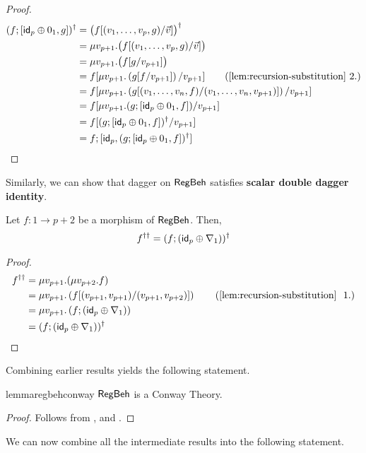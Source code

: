 \begin{proof}
\begin{align*}
(f ; \lc  \id_p \oplus 0_1 , g \rc)^\dagger & = \big(f[(v_1,\dots,v_p, g)/\vec{v}]\big)^\dagger	
\\
& = \mu v_{p+1}.\big(f[(v_1,\dots,v_p, g)/\vec{v}]\big)
\\
& = \mu v_{p+1}.\big(f[g/v_{p+1}]\big)
\\
& = f[\mu v_{p+1}. \left(g[f/v_{p+1}]\right)/v_{p+1}] \tag{\Cref{lem:recursion-substitution}~2.}
\\
& = f[\mu v_{p+1}. \left(g[(v_1,\dots,v_n,f)/(v_1,\dots,v_n,v_{p+1})]\right)/v_{p+1}]\\
& = f[\mu v_{p+1}. (g ;  \lc  \id_p \oplus 0_1 , f\rc)/v_{p+1}]
\\
& = f[(g ;  \lc  \id_p \oplus 0_1 , f\rc)^\dagger/v_{p+1}]
\\
& = f ; \lc \id_p, (g ;  \lc  \id_p \oplus 0_1 , f\rc)^\dagger\rc \qedhere
\end{align*}
\end{proof}
Similarly, we can show that dagger on $\mathsf{RegBeh}$ satisfies \textbf{scalar double dagger identity}. 
\begin{lemma}\label{conway3}
Let $f \colon 1 \to p + 2$ be a morphism of $\mathsf{RegBeh}$. Then,
		$$
		f^{\dagger\dagger} = (f ; (\mathsf{id}_p\oplus \nabla_1))^\dagger
		$$
\end{lemma}
\begin{proof}
\begin{align*}
f^{\dagger\dagger} &= \mu v_{p+1}.(\mu v_{p+2}.f)
\\
& = \mu v_{p+1}. \left(f [(v_{p+1}, v_{p+1}) / (v_{p+1}, v_{p+2})]\right) \tag{\Cref{lem:recursion-substitution}~ 1.}
\\
& = \mu v_{p+1}. \left(f;(\id_p\oplus \nabla_1)\right)
\\
& = (f ; (\id_p\oplus \nabla_1))^\dagger \tag*{\hfill\qedhere}
\end{align*}
\end{proof}
Combining earlier results yields the following statement.
\begin{restatable}{lemma}{regbehconway}\label{lem:regbehconway}
$\mathsf{RegBeh}$ is a Conway Theory.	
\end{restatable}
\begin{proof}
	Follows from ,  and .
\end{proof}
We can now combine all the intermediate results into the following statement.

